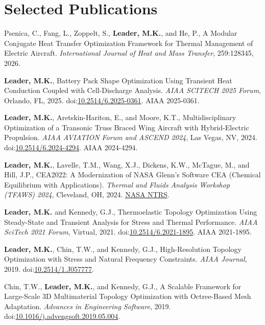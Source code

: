 \section{Selected Publications}
\begin{onecolentry}
    \begin{highlights}
      \item Psenica, C., Fang, L., Zoppelt, S., \textbf{Leader, M.K.}, and He, P., A Modular Conjugate Heat Transfer Optimization Framework for Thermal Management of Electric Aircraft. \textit{International Journal of Heat and Mass Transfer}, 259:128345, 2026.
      \item \textbf{Leader, M.K.}, Battery Pack Shape Optimization Using Transient Heat Conduction Coupled with Cell-Discharge Analysis. \textit{AIAA SCITECH 2025 Forum}, Orlando, FL, 2025. doi:\href{https://arc.aiaa.org/doi/abs/10.2514/6.2025-0361}{10.2514/6.2025-0361}. AIAA 2025-0361.
      \item \textbf{Leader, M.K.}, Aretskin-Hariton, E., and Moore, K.T., Multidisciplinary Optimization of a Transonic Truss Braced Wing Aircraft with Hybrid-Electric Propulsion. \textit{AIAA AVIATION Forum and ASCEND 2024}, Las Vegas, NV, 2024. doi:\href{https://arc.aiaa.org/doi/abs/10.2514/6.2024-4294}{10.2514/6.2024-4294}. AIAA 2024-4294.
      \item \textbf{Leader, M.K.}, Lavelle, T.M., Wang, X.J., Dickens, K.W., McTague, M., and Hill, J.P., CEA2022: A Modernization of NASA Glenn's Software CEA (Chemical Equilibrium with Applications). \textit{Thermal and Fluids Analysis Workshop (TFAWS) 2024}, Cleveland, OH, 2024. \href{https://ntrs.nasa.gov/citations/20240009728}{NASA NTRS}.
      \item \textbf{Leader, M.K.} and Kennedy, G.J., Thermoelastic Topology Optimization Using Steady-State and Transient Analysis for Stress and Thermal Performance. \textit{AIAA SciTech 2021 Forum}, Virtual, 2021. doi:\href{https://arc.aiaa.org/doi/abs/10.2514/6.2021-1895}{10.2514/6.2021-1895}. AIAA 2021-1895.
      \item \textbf{Leader, M.K.}, Chin, T.W., and Kennedy, G.J., High-Resolution Topology Optimization with Stress and Natural Frequency Constraints. \textit{AIAA Journal}, 2019. doi:\href{https://arc.aiaa.org/doi/10.2514/1.J057777}{10.2514/1.J057777}.
      \item Chin, T.W., \textbf{Leader, M.K.}, and Kennedy, G.J., A Scalable Framework for Large-Scale 3D Multimaterial Topology Optimization with Octree-Based Mesh Adaptation. \textit{Advances in Engineering Software}, 2019. doi:\href{https://www.sciencedirect.com/science/article/abs/pii/S0965997818309682}{10.1016/j.advengsoft.2019.05.004}.
    \end{highlights}
\end{onecolentry}

